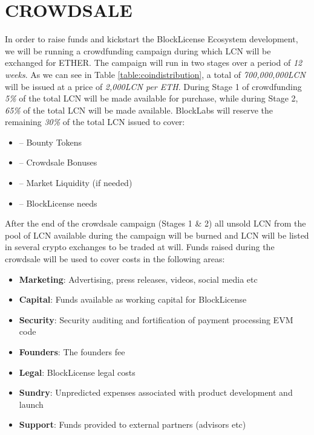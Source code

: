 \newpage
\section{CROWDSALE} \label{crowdsale}

In order to raise funds and kickstart the BlockLicense Ecosystem development, we will be running a crowdfunding campaign during which LCN will be exchanged for ETHER. The campaign will run in two stages over a period of \textit{12 weeks}. As we can see in Table \ref{table:coindistribution}, a total of \textit{700,000,000LCN} will be issued at a price of \textit{2,000LCN per ETH}. During Stage 1 of crowdfunding \textit{5\%} of the total LCN will be made available for purchase, while during Stage 2, \textit{65\%} of the total LCN will be made available. 
\newline
\bigskip
BlockLabs will reserve the remaining \textit{30\%} of the total LCN issued to cover:

\begin{itemize}
\item -- Bounty Tokens
\item -- Crowdsale Bonuses
\item -- Market Liquidity (if needed)
\item -- BlockLicense needs
\end{itemize}

After the end of the crowdsale campaign (Stages 1 \& 2) all unsold LCN from the pool of LCN available during the campaign will be burned and LCN will be listed in several crypto exchanges to be traded at will.
\newline
\bigskip
Funds raised during the crowdsale will be used to cover costs in the following areas:

\begin{itemize}
\item \textbf{Marketing}: Advertising, press releases, videos, social media etc
\item \textbf{Capital}: Funds available as working capital for BlockLicense
\item \textbf{Security}: Security auditing and fortification of payment processing EVM code
\item \textbf{Founders}: The founders fee
\item \textbf{Legal}: BlockLicense legal costs
\item \textbf{Sundry}: Unpredicted expenses associated with product development and launch
\item \textbf{Support}: Funds provided to external partners (advisors etc)
\end{itemize}

